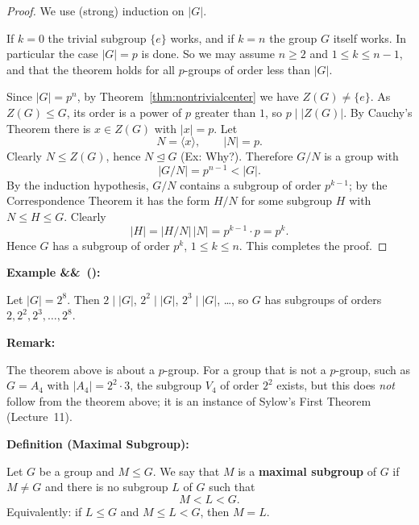 \documentclass[11pt,a4paper]{article}
\newenvironment{definition}[1]{
	\begin{definitionbox}
		\textbf{\color{primaryColor}Definition (#1):} 
	}{
	\end{definitionbox}
}
\newcounter{examplecnt}[section]
\newenvironment{example}[1][]{
	\stepcounter{examplecnt}
	\begin{examplebox}
		\textbf{\color{exampleColor}Example \arabic{examplecnt}\ifx&#1&\else\ (#1)\fi:} 
	}{
	\end{examplebox}
}
\newenvironment{remark}{
	\begin{remarkbox}
		\textbf{\color{remarkColor}Remark:} 
	}{
	\end{remarkbox}
}
\begin{document}
	\begin{proof}
		We use (strong) induction on $|G|$.
		
		\vspace{0.5em}
		\noindent If $k = 0$ the trivial subgroup $\{e\}$ works, and if $k = n$ the group $G$ itself works. In particular the case $|G| = p$ is done. So we may assume $n \ge 2$ and $1 \le k \le n - 1$, and that the theorem holds for all $p$-groups of order less than $|G|$.
		
		\vspace{0.5em}
		\noindent Since $|G| = p^n$, by Theorem~\ref{thm:nontrivialcenter} we have $Z(G) \neq \{e\}$. As $Z(G) \le G$, its order is a power of $p$ greater than $1$, so $p \mid |Z(G)|$. By Cauchy's Theorem there is $x \in Z(G)$ with $|x| = p$. Let
		\[
		N = \langle x \rangle, \qquad |N| = p .
		\]
		Clearly $N \leq Z(G)$, hence $N \trianglelefteq G$ \textcolor{exerciseColor}{(Ex: Why?)}. Therefore $G/N$ is a group with
		\[
		|G/N| = p^{n-1} < |G| .
		\]
		By the induction hypothesis, $G/N$ contains a subgroup of order $p^{k-1}$; by the Correspondence Theorem it has the form $H/N$ for some subgroup $H$ with $N \le H \le G$. Clearly
		\[
		|H| = |H/N|\,|N| = p^{k-1} \cdot p = p^k.
		\]
		Hence $G$ has a subgroup of order $p^k$, $1 \leq k \leq n$. This completes the proof.
	\end{proof}
	
	\begin{example}
		Let $|G| = 2^8$. Then $2 \mid |G|$, $2^2 \mid |G|$, $2^3 \mid |G|$, \dots, so $G$ has subgroups of orders $2, 2^2, 2^3, \dots, 2^8$.
	\end{example}
	
	\begin{remark}
		The theorem above is about a $p$-group. For a group that is not a $p$-group, such as $G = A_4$ with $|A_4| = 2^2 \cdot 3$, the subgroup $V_4$ of order $2^2$ exists, but this does \emph{not} follow from the theorem above; it is an instance of Sylow's First Theorem (Lecture~11).
	\end{remark}
	
	\begin{definition}{Maximal Subgroup}
		Let $G$ be a group and $M \leq G$. We say that $M$ is a \textbf{maximal subgroup} of $G$ if $M \neq G$ and there is no subgroup $L$ of $G$ such that
		\[
		M < L < G .
		\]
		Equivalently: if $L \leq G$ and $M \leq L < G$, then $M = L$.
	\end{definition}
	
\end{document}
